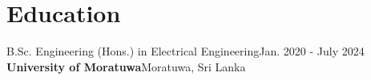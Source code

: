 \section{\Large Education}
  \resumeSubHeadingListStart
    \resumeSubheading
      {B.Sc. Engineering (Hons.) in Electrical Engineering}{Jan. 2020 - July 2024}
      {\textbf{University of Moratuwa}}{Moratuwa, Sri Lanka}
      \resumeItemListStart
      \resumeItemListEnd
      \vspace{0.5\baselineskip}

  \resumeSubHeadingListEnd
